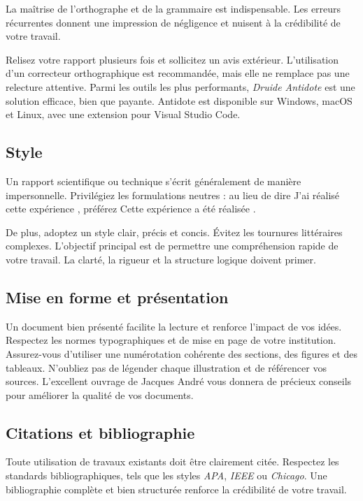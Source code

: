 La maîtrise de l'orthographe et de la grammaire est indispensable. Les erreurs récurrentes donnent une impression de négligence et nuisent à la crédibilité de votre travail.

Relisez votre rapport plusieurs fois et sollicitez un avis extérieur. L'utilisation d'un correcteur orthographique est recommandée, mais elle ne remplace pas une relecture attentive. Parmi les outils les plus performants, \textit{Druide Antidote} est une solution efficace, bien que payante. Antidote est disponible sur Windows, macOS et Linux, avec une extension pour Visual Studio Code.

\subsection{Style}

Un rapport scientifique ou technique s'écrit généralement de manière impersonnelle. Privilégiez les formulations neutres : au lieu de dire \og J'ai réalisé cette expérience \fg, préférez \og Cette expérience a été réalisée \fg.

De plus, adoptez un style clair, précis et concis. Évitez les tournures littéraires complexes. L'objectif principal est de permettre une compréhension rapide de votre travail. La clarté, la rigueur et la structure logique doivent primer.

\subsection{Mise en forme et présentation}

Un document bien présenté facilite la lecture et renforce l'impact de vos idées. Respectez les normes typographiques et de mise en page de votre institution. Assurez-vous d'utiliser une numérotation cohérente des sections, des figures et des tableaux. N'oubliez pas de légender chaque illustration et de référencer vos sources. L'excellent ouvrage de Jacques André vous donnera de précieux conseils pour améliorer la qualité de vos documents.

\subsection{Citations et bibliographie}

Toute utilisation de travaux existants doit être clairement citée. Respectez les standards bibliographiques, tels que les styles \textit{APA}, \textit{IEEE} ou \textit{Chicago}. Une bibliographie complète et bien structurée renforce la crédibilité de votre travail.

